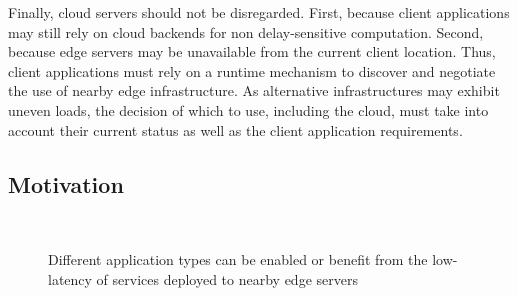 
Finally, cloud servers should not be disregarded. First, because client applications may still rely on cloud backends for non delay-sensitive computation. Second, because edge servers may be unavailable from the current client location. Thus, client applications must rely on a runtime mechanism to discover and negotiate the use of nearby edge infrastructure. As alternative infrastructures may exhibit uneven loads, the decision of which to use, including the cloud, must take into account their current status as well as the client application requirements. 



\subsection{Motivation}

\begin{figure}[htbp]
	\centering
	\hfill
	~
	\hfill
	\caption{Different application types can be enabled or benefit from the low-latency of services deployed to nearby edge servers} \label{fig:motivational-cases}
\end{figure}


